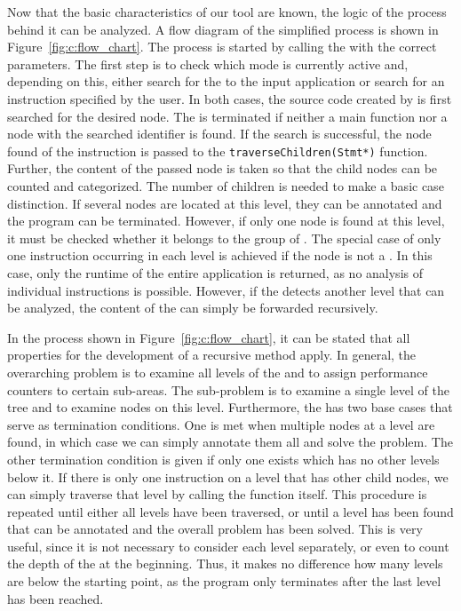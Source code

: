 Now that the basic characteristics of our tool are known, the logic of the process behind it can be analyzed. A flow diagram of the simplified process is shown in Figure~\ref{fig:c:flow_chart}. The process is started by calling the \TOOL with the correct parameters. The first step is to check which mode is currently active and, depending on this, either search for the \ENTPOI to the input application or search for an instruction specified by the user. In both cases, the source code created by \CLANG is first searched for the desired node. The \TOOL is terminated if neither a main function nor a node with the searched identifier is found. If the search is successful, the node found of the instruction is passed to the \lstinline{traverseChildren(Stmt*)} function. Further, the content of the passed node is taken so that the child nodes can be counted and categorized. The number of children is needed to make a basic case distinction. If several nodes are located at this level, they can be annotated and the program can be terminated. However, if only one node is found at this level, it must be checked whether it belongs to the group of \PARSTAS. The special case of only one instruction occurring in each level is achieved if the node is not a \PARSTA. In this case, only the runtime of the entire application is returned, as no analysis of individual instructions is possible. However, if the \TOOL detects another level that can be analyzed, the content of the \PARSTA can simply be forwarded recursively. 

In the process shown in Figure~\ref{fig:c:flow_chart}, it can be stated that all properties for the development of a recursive method apply. In general, the overarching problem is to examine all levels of the \astsmall and to assign performance counters to certain sub-areas. The sub-problem is to examine a single level of the tree and to examine nodes on this level. Furthermore, the \TOOL has two base cases that serve as termination conditions. One is met when multiple nodes at a level are found, in which case we can simply annotate them all and solve the problem. The other termination condition is given if only one \LEASTA exists which has no other levels below it. If there is only one instruction on a level that has other child nodes, we can simply traverse that level by calling the function itself. This procedure is repeated until either all levels have been traversed, or until a level has been found that can be annotated and the overall problem has been solved. This is very useful, since it is not necessary to consider each level separately, or even to count the depth of the \astsmall at the beginning. Thus, it makes no difference how many levels are below the starting point, as the program only terminates after the last level has been reached. 

